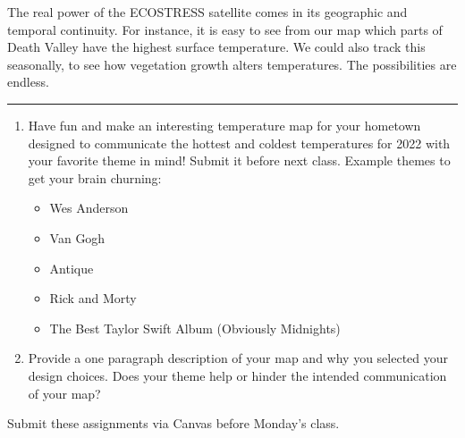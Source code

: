 \documentclass[oneside,a4paper,11pt,explicit]{book}
\begin{document}

The real power of the ECOSTRESS satellite comes in its geographic and temporal continuity. For instance, it is easy to see from our map which parts of Death Valley have the highest surface temperature. We could also track this seasonally, to see how vegetation growth alters temperatures. The possibilities are endless.

\vspace{.25em}

\hrule

\vspace{1 em}

\begin{tcolorbox}[colback=yellow!5!white,colframe=red!80!blue,title= \vspace{.2em} \Large Map of the Week Assignments]
	\large
	\begin{enumerate}
		\item Have fun and make an interesting temperature map for your hometown designed to communicate the hottest and coldest temperatures for 2022 with your favorite theme in mind! Submit it before next class. Example themes to get your brain churning:
		\begin{itemize}
			\item Wes Anderson
			\item Van Gogh
			\item Antique
			\item Rick and Morty
			\item The Best Taylor Swift Album (Obviously Midnights)
		\end{itemize}
            \item Provide a one paragraph description of your map and why you selected your design choices. Does your theme help or hinder the intended communication of your map?
	\end{enumerate}
	Submit these assignments via Canvas before Monday's class.
\end{tcolorbox}

\vspace{2 em}
\end{document}
